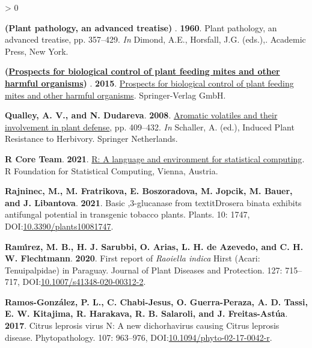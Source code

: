 \documentclass{ufdissertation}[overrideChapters] %
\newlength{\cslhangindent}
\newenvironment{CSLReferences}[2] %
 {%
  \setlength{\parindent}{0pt}
  \ifodd #1 \everypar{\setlength{\hangindent}{\cslhangindent}}\ignorespaces\fi
  \ifnum #2 > 0
  \setlength{\parskip}{#2\baselineskip}
  \fi
 }%
 {}
\begin{document}
{\begin{CSLReferences}{1}{1}
\leavevmode{}%
\textbf{(Plant pathology, an advanced treatise) }. \textbf{1960}. Plant pathology, an advanced treatise, pp. 357--429. \emph{In} Dimond, A.E., Horsfall, J.G. (eds.),. Academic Press, New York.

\leavevmode{}%
\textbf{(\href{https://www.ebook.de/de/product/25040570/prospects_for_biological_control_of_plant_feeding_mites_and_other_harmful_organisms.html}{Prospects for biological control of plant feeding mites and other harmful organisms}) }. \textbf{2015}. \href{https://www.ebook.de/de/product/25040570/prospects_for_biological_control_of_plant_feeding_mites_and_other_harmful_organisms.html}{Prospects for biological control of plant feeding mites and other harmful organisms}. Springer-Verlag GmbH.

\leavevmode{}%
\textbf{Qualley, A. V., and N. Dudareva}. \textbf{2008}. \href{https://doi.org/10.1007/978-1-4020-8182-8_3}{Aromatic volatiles and their involvement in plant defense}, pp. 409--432. \emph{In} Schaller, A. (ed.), Induced Plant Resistance to Herbivory. Springer Netherlands.

\leavevmode{}%
\textbf{R Core Team}. \textbf{2021}. \href{https://www.R-project.org/}{R: A language and environment for statistical computing}. R Foundation for Statistical Computing, Vienna, Austria.

\leavevmode{}%
\textbf{Rajninec, M., M. Fratrikova, E. Boszoradova, M. Jopcik, M. Bauer, and J. Libantova}. \textbf{2021}. Basic ,3-glucanase from {textit{Drosera binata}} exhibits antifungal potential in transgenic tobacco plants. Plants. 10: 1747, DOI:\href{https://doi.org/10.3390/plants10081747}{10.3390/plants10081747}.

\leavevmode{}%
\textbf{Ramı́rez, M. B., H. J. Sarubbi, O. Arias, L. H. de Azevedo, and C. H. W. Flechtmann}. \textbf{2020}. First report of {\emph{Raoiella indica}} {Hirst} ({Acari}: {Tenuipalpidae}) in {Paraguay}. Journal of Plant Diseases and Protection. 127: 715--717, DOI:\href{https://doi.org/10.1007/s41348-020-00312-2}{10.1007/s41348-020-00312-2}.

\leavevmode{}%
\textbf{Ramos-González, P. L., C. Chabi-Jesus, O. Guerra-Peraza, A. D. Tassi, E. W. Kitajima, R. Harakava, R. B. Salaroli, and J. Freitas-Astúa}. \textbf{2017}. {Citrus leprosis virus} {N}: A new dichorhavirus causing {Citrus leprosis} disease. Phytopathology{\textregistered}. 107: 963--976, DOI:\href{https://doi.org/10.1094/phyto-02-17-0042-r}{10.1094/phyto-02-17-0042-r}.


\end{CSLReferences}}
\end{document}

